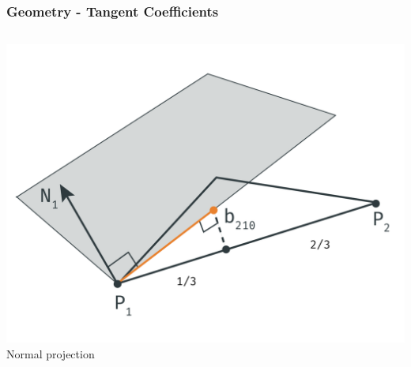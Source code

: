 	\begin{frame}\frametitle{Geometry - Tangent Coefficients}
		\begin{columns}
			\begin{column}{0.6\textwidth}
				\begin{center}
				\includegraphics[width=\textwidth]{img/1_single/geometry_2.png}
				\small{Normal projection}
				\end{center}
			\end{column}
		\end{columns}
	\end{frame}



